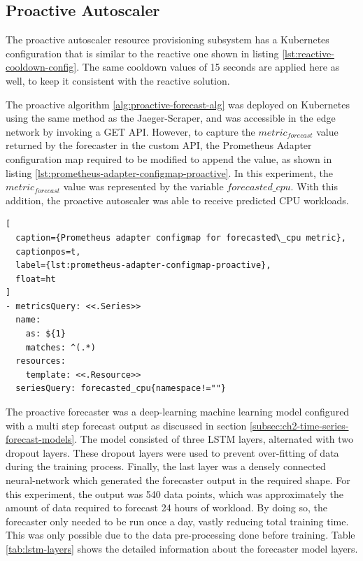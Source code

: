 \subsection{Proactive Autoscaler}
\label{subsec:ch5-proactive-auto-subsection}

The proactive autoscaler resource provisioning subsystem has a Kubernetes configuration that is similar to the reactive one shown in listing \ref{lst:reactive-cooldown-config}. The same cooldown values of 15 seconds are applied here as well, to keep it consistent with the reactive solution.\par

The proactive algorithm \ref{alg:proactive-forecast-alg} was deployed on Kubernetes using the same method as the Jaeger-Scraper, and was accessible in the edge network by invoking a GET API. However, to capture the $metric_{forecast}$ value returned by the forecaster in the custom API, the Prometheus Adapter configuration map required to be modified to append the value, as shown in listing \ref{lst:prometheus-adapter-configmap-proactive}. In this experiment, the $metric_{forecast}$ value was represented by the variable $forecasted\_cpu$. With this addition, the proactive autoscaler was able to receive predicted CPU workloads.\par

\begin{lstlisting}[
  caption={Prometheus adapter configmap for forecasted\_cpu metric},
  captionpos=t,
  label={lst:prometheus-adapter-configmap-proactive},
  float=ht
]
- metricsQuery: <<.Series>>
  name:
    as: ${1}
    matches: ^(.*)
  resources:
    template: <<.Resource>>
  seriesQuery: forecasted_cpu{namespace!=""}
\end{lstlisting}

The proactive forecaster was a deep-learning machine learning model configured with a multi step forecast output as discussed in section \ref{subsec:ch2-time-series-forecast-models}. The model consisted of three LSTM layers, alternated with two dropout layers. These dropout layers were used to prevent over-fitting of data during the training process. Finally, the last layer was a densely connected neural-network which generated the forecaster output in the required shape. For this experiment, the output was 540 data points, which was approximately the amount of data required to forecast 24 hours of workload. By doing so, the forecaster only needed to be run once a day, vastly reducing total training time. This was only possible due to the data pre-processing done before training. Table \ref{tab:lstm-layers} shows the detailed information about the forecaster model layers.\par

